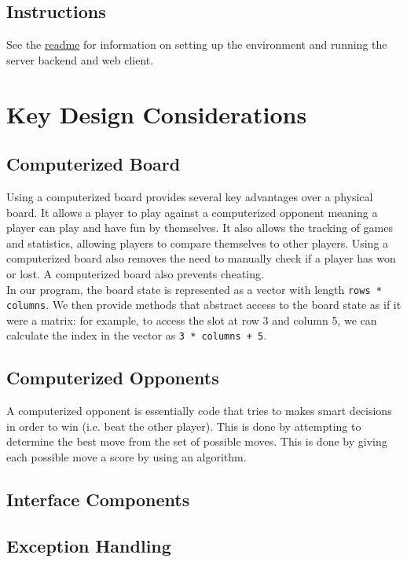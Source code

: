 \documentclass{article}
\begin{document}
\subsection{Instructions}

See the \href{run:../README.md}{readme} for information on setting up the environment and running the server backend and web client.

\section{Key Design Considerations}

\subsection{Computerized Board}
Using a computerized board provides several key advantages over a physical board. It allows a player to play against a computerized opponent meaning a player can play and have fun by themselves. It also allows the tracking of games and statistics, allowing players to compare themselves to other players. Using a computerized board also removes the need to manually check if a player has won or lost. A computerized board also prevents cheating. \\

In our program, the board state is represented as a vector with length \texttt{rows * columns}. We then provide methods that abstract access to the board state as if it were a matrix: for example, to access the slot at row 3 and column 5, we can calculate the index in the vector as \texttt{3 * columns + 5}.

\subsection{Computerized Opponents}
A computerized opponent is essentially code that tries to makes smart decisions in order to win (i.e. beat the other player). This is done by attempting to determine the best move from the set of possible moves. This is done by giving each possible move a score by using an algorithm. 



\subsection{Interface Components}

\subsection{Exception Handling}
\end{document}
